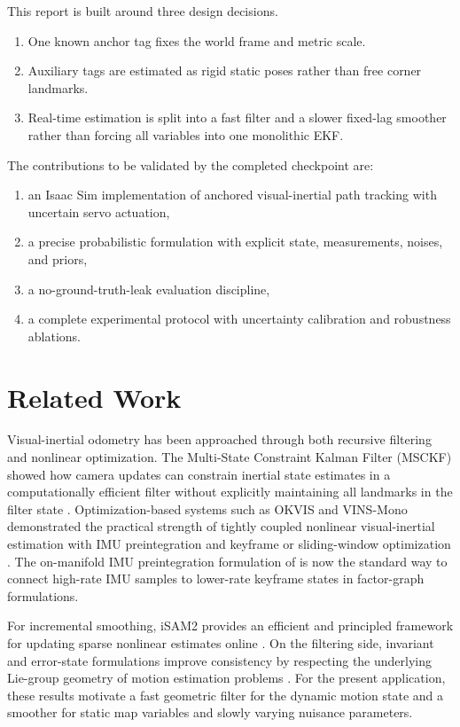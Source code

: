 \documentclass[11pt]{article}
\begin{document}
This report is built around three design decisions.
\begin{enumerate}[leftmargin=1.5em]
    \item One known anchor tag fixes the world frame and metric scale.
    \item Auxiliary tags are estimated as rigid static poses rather than free corner landmarks.
    \item Real-time estimation is split into a fast filter and a slower fixed-lag smoother rather than forcing all variables into one monolithic EKF.
\end{enumerate}

The contributions to be validated by the completed checkpoint are:
\begin{enumerate}[leftmargin=1.5em]
    \item an Isaac Sim implementation of anchored visual-inertial path tracking with uncertain servo actuation,
    \item a precise probabilistic formulation with explicit state, measurements, noises, and priors,
    \item a no-ground-truth-leak evaluation discipline,
    \item a complete experimental protocol with uncertainty calibration and robustness ablations.
\end{enumerate}

\section{Related Work}
Visual-inertial odometry has been approached through both recursive filtering and nonlinear optimization. The Multi-State Constraint Kalman Filter (MSCKF) showed how camera updates can constrain inertial state estimates in a computationally efficient filter without explicitly maintaining all landmarks in the filter state \citep{mourikis2007msckf}. Optimization-based systems such as OKVIS and VINS-Mono demonstrated the practical strength of tightly coupled nonlinear visual-inertial estimation with IMU preintegration and keyframe or sliding-window optimization \citep{leutenegger2015okvis, qin2018vinsmono}. The on-manifold IMU preintegration formulation of \citet{forster2017preintegration} is now the standard way to connect high-rate IMU samples to lower-rate keyframe states in factor-graph formulations.

For incremental smoothing, iSAM2 provides an efficient and principled framework for updating sparse nonlinear estimates online \citep{kaess2012isam2}. On the filtering side, invariant and error-state formulations improve consistency by respecting the underlying Lie-group geometry of motion estimation problems \citep{barrau2017inekf, brossard2018invariantvislam}. For the present application, these results motivate a fast geometric filter for the dynamic motion state and a smoother for static map variables and slowly varying nuisance parameters.
\end{document}
